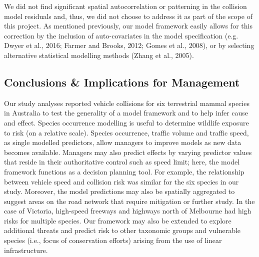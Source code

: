 We did not find significant spatial autocorrelation or patterning in the collision model residuals and, thus, we did not choose to address it as part of the scope of this project.  As mentioned previously, our model framework easily allows for this correction by the inclusion of auto-covariates in the model specification (e.g. Dwyer et al., 2016; Farmer and Brooks, 2012; Gomes et al., 2008), or by selecting alternative statistical modelling methods (Zhang et al., 2005).

\subsection{Conclusions \& Implications for Management}

Our study analyses reported vehicle collisions for six terrestrial mammal species in Australia to test the generality of a model framework and to help infer cause and effect. Species occurrence modelling is useful to determine wildlife exposure to risk (on a relative scale). Species occurrence, traffic volume and traffic speed, as single modelled predictors, allow managers to improve models as new data becomes available. Managers may also predict effects by varying predictor values that reside in their authoritative control such as speed limit; here, the model framework functions as a decision planning tool. For example, the relationship between vehicle speed and collision risk was similar for the six species in our study. Moreover, the model predictions may also be spatially aggregated to suggest areas on the road network that require mitigation or further study.  In the case of Victoria, high-speed freeways and highways north of Melbourne had high risks for multiple species. Our framework may also be extended to explore additional threats and predict risk to other taxonomic groups and vulnerable species (i.e., focus of conservation efforts) arising from the use of linear infrastructure.

